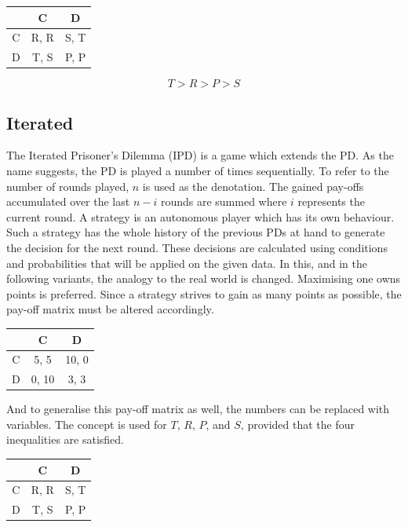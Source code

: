 \documentclass{article}
\begin{document}
\begin{center}
\begin{tabular}{ c|c|c }
   & C & D \\ 
   \hline
 C & R, R & S, T\\  
   \hline
 D & T, S & P, P
\end{tabular}
\end{center}

$$T > R > P > S$$

\subsection{Iterated}
		
The Iterated Prisoner's Dilemma (IPD) is a game which extends the PD. 
As the name suggests, the PD is played a number of times sequentially. 
To refer to the number of rounds played, $n$ is used as the denotation. 
The gained pay-offs accumulated over the last $n-i$ rounds are summed where $i$ represents the current round.
A strategy is an autonomous player which has its own behaviour.
Such a strategy has the whole history of the previous PDs at hand to generate the decision for the next round.
These decisions are calculated using conditions and probabilities that will be applied on the given data.
In this, and in the following variants, the analogy to the real world is changed.
Maximising one owns points is preferred.
Since a strategy strives to gain as many points as possible, the pay-off matrix must be altered accordingly.\\

\begin{center}
\begin{tabular}{ c|c|c }
   & C & D \\ 
   \hline
 C & 5, 5 & 10, 0\\  
   \hline
 D & 0, 10 & 3, 3
\end{tabular}
\end{center}

And to generalise this pay-off matrix as well, the numbers can be replaced with variables.
The concept is used for $T$, $R$, $P$, and $S$, provided that the four inequalities are satisfied.

\begin{center}
\begin{tabular}{ c|c|c }
   & C & D \\ 
   \hline
 C & R, R & S, T\\  
   \hline
 D & T, S & P, P
\end{tabular}
\end{center}
\end{document}
